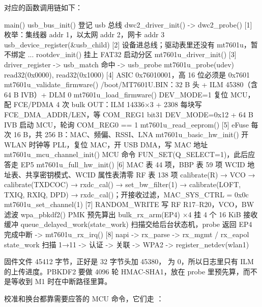 对应的函数调用链如下：

\begin{txtcode}
main()
  usb_bus_init()                       登记 usb 总线
  dwc2_driver_init() -> dwc2_probe()   [1] 枚举：集线器 addr 1，以太网 addr 2，网卡 addr 3
    usb_device_register(&usb_child)    [2] 设备进总线；驱动表里还没有 mt7601u，暂不绑定
  ...
  rootdev_init()                       挂上 FAT32 启动分区
  mt7601u_driver_init()                [3] driver_register -> usb_match 命中 -> usb_probe
    mt7601u_probe(udev)
      read32(0x0000), read32(0x1000)   [4] ASIC 0x76010001，高 16 位必须是 0x7601
      mt7601u_validate_firmware()         /boot/MT7601U.BIN：32 B 头 + ILM 45380（含 64 B IVB）+ DLM 0
      mt7601u_load_firmware()             DEV_MODE=1 复位 MCU，配 FCE/PDMA
        4 次 bulk OUT：ILM 14336×3 + 2308   每块写 FCE_DMA_ADDR/LEN，等 COM_REG1 bit31
        DEV_MODE=0x12 + 64 B IVB          启动 MCU，轮询 COM_REG0 == 1
      mt7601u_read_eeprom()            [5] eFuse 每次 16 B，共 256 B：MAC、频偏、RSSI、LNA
      mt7601u_basic_hw_init()             开 WLAN 时钟等 PLL，复位 MAC，开 USB DMA，写 MAC 地址
      mt7601u_mcu_channel_init()          MCU 命令 FUN_SET(Q_SELECT=1)，此后应答走 EP5
      mt7601u_full_hw_init()           [6] MAC 表 44 项，BBP 表 59 项
                                          WCID 地址表、共享密钥模式、WCID 属性表清零
                                          RF 表 138 项
                                          calibrate(R) → VCO → calibrate(TXDCOC) → rxdc_cal()
                                          → set_bw_filter(1) → calibrate(LOFT, TXIQ, RXIQ, DPD)
                                          → rxdc_cal()；开接收过滤，MAC_SYS_CTRL = 0x0c
      mt7601u_set_channel(1)           [7] RANDOM_WRITE 写 RF R17–R20，VCO，BW 滤波
      wpa_pbkdf2()                        PMK 预先算出
      bulk_rx_arm(EP4) ×4                 挂 4 个 16 KiB 接收缓冲
      queue_delayed_work(state_work)      扫描交给后台状态机，probe 返回
EP4 完成中断 -> mt7601u_rx_irq()        [8] napi -> rx_parse -> rx_mgmt / rx_eapol
state_work                                扫描 1→11 -> 认证 -> 关联 -> WPA2 -> register_netdev(wlan1)
\end{txtcode}

固件文件 45412 字节，正好是 32 字节头加  45380， 为 0，所以日志里只有 ILM 的上传进度。PBKDF2 要做 4096 轮 HMAC-SHA1，放在 probe 里预先算，而不是等收到 M1 时在中断路径里算。

校准和换台都靠需要应答的 MCU 命令，它们走 ：

